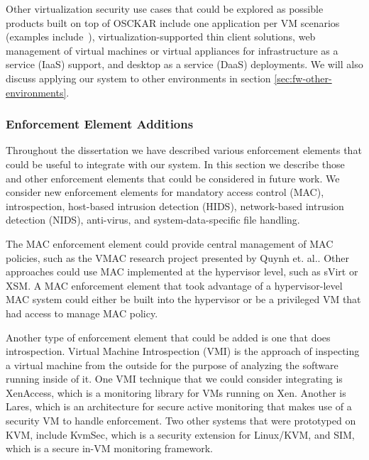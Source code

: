 Other virtualization security use cases that could be explored as possible products built on top of OSCKAR include one application per VM scenarios (examples include~\cite{apiary_usenix_2010,virtics_2010,qubes-os_2010}), virtualization-supported thin client solutions, web management of virtual machines or virtual appliances for infrastructure as a service (IaaS) support, and desktop as a service (DaaS) deployments. We will also discuss applying our system to other environments in section \ref{sec:fw-other-environments}. 

\subsubsection{Enforcement Element Additions}

Throughout the dissertation we have described various enforcement elements that could be useful to integrate with our system. In this section we describe those and other enforcement elements that could be considered in future work. We consider new enforcement elements for mandatory access control (MAC), introspection, host-based intrusion detection (HIDS), network-based intrusion detection (NIDS), anti-virus, and system-data-specific file handling.

The MAC enforcement element could provide central management of MAC policies, such as the VMAC research project presented by Quynh et. al.\cite{Quynh_2006}. Other approaches could use MAC implemented at the hypervisor level, such as sVirt\cite{sVirt_website} or XSM\cite{xsm_xen_summit_3rd,xsm_xen_summit_4th}. A MAC enforcement element that took advantage of a hypervisor-level MAC system could either be built into the hypervisor or be a privileged VM that had access to manage MAC policy.

Another type of enforcement element that could be added is one that does introspection. Virtual Machine Introspection (VMI) is the approach of inspecting a virtual machine from the outside for the purpose of analyzing the software running inside of it\cite{VMI_IDS_2003}. One VMI technique that we could consider integrating is XenAccess\cite{xenaccess_07}, which is a monitoring library for VMs running on Xen. Another is Lares\cite{payne_lares_2008}, which is an architecture for secure active monitoring that makes use of a security VM to handle enforcement. Two other systems that were prototyped on KVM, include KvmSec\cite{lombardi_2009}, which is a security extension for Linux/KVM, and SIM\cite{sharif_2009}, which is a secure in-VM monitoring framework.
 
